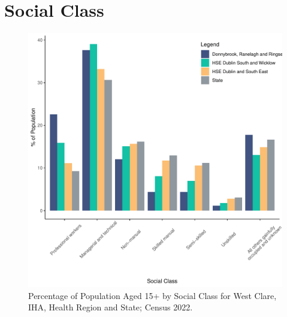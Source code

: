 \documentclass{article}
\begin{document}
\section{Social Class}\label{sect:SC}
\begin{figure}[H]
	\centering
	\includegraphics[width = 140mm]{../figures/SocialClassED.pdf}
	\caption{Percentage of Population Aged 15+ by Social Class for West Clare, IHA, Health Region and State; Census 2022.}
	\label{fig:vbnv}
	\end{figure}
\end{document}
